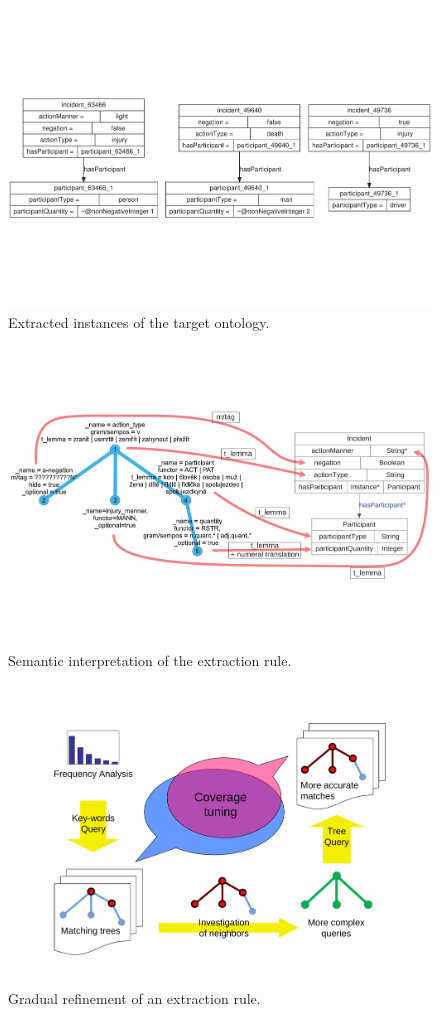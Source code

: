 \begin{figure}
	\centering
		\includegraphics[angle=-90, width=\hsize]{../img/ch3_instances}
	\caption{Extracted instances of the target ontology.}
	\label{fig:instatnces}
\end{figure}


\begin{figure}
	\centering
		\includegraphics[angle=-90, width=0.9\hsize]{../img/ch3_semantic_interpretation}
	\caption{Semantic interpretation of the extraction rule.}
	\label{fig:ch3_semantic_interpretation}
\end{figure}


\begin{figure}
	\centering
		\includegraphics[angle=-90, width=0.5\hsize]{../img/ch3_coverge_tuning}
	\caption{Gradual refinement of an extraction rule.}
	\label{fig:ch3_coverge_tuning}
\end{figure}


